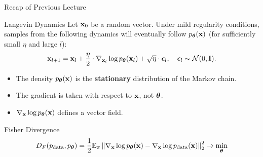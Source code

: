 \documentclass{beamer}
\begin{document}
\begin{frame}
	\titlepage
	\resetonslide	
\end{frame}
\begin{frame}{Recap of Previous Lecture}
	\vspace{-0.3cm}
	\begin{block}{Langevin Dynamics}
		Let $\mathbf{x}_0$ be a random vector. Under mild regularity conditions, samples from the following dynamics will eventually follow $p_{\boldsymbol{\theta}}(\mathbf{x})$ (for sufficiently small $\eta$ and large $l$):
		\[
			\mathbf{x}_{l + 1} = \mathbf{x}_l + \frac{\eta}{2} \cdot \nabla_{\mathbf{x}_l} \log p_{\boldsymbol{\theta}}(\mathbf{x}_l) + \sqrt{\eta} \cdot \boldsymbol{\epsilon}_l, \quad \boldsymbol{\epsilon}_l \sim \mathcal{N}(0, \mathbf{I}).
		\]
		\vspace{-0.5cm}
		\begin{itemize}
			\item The density $p_{\boldsymbol{\theta}}(\mathbf{x})$ is the \textbf{stationary} distribution of the Markov chain.
			\item The gradient is taken with respect to $\mathbf{x}$, not $\boldsymbol{\theta}$.
			\item $\nabla_{\mathbf{x}} \log p_{\boldsymbol{\theta}}(\mathbf{x})$ defines a vector field.
		\end{itemize}
	\end{block}
	\vspace{-0.3cm}
	\begin{block}{Fisher Divergence}
		\vspace{-0.7cm}
		\[
			D_F(p_{\text{data}}, p_{\boldsymbol{\theta}}) = \frac{1}{2}\mathbb{E}_{\pi}\left\| \nabla_{\mathbf{x}}\log p_{\boldsymbol{\theta}}(\mathbf{x}) - \nabla_{\mathbf{x}} \log p_{\text{data}}(\mathbf{x}) \right\|_2^2 \rightarrow \min_{\boldsymbol{\theta}}
		\]
		\vspace{-0.7cm}
	\end{block}
\end{frame}
\end{document}
